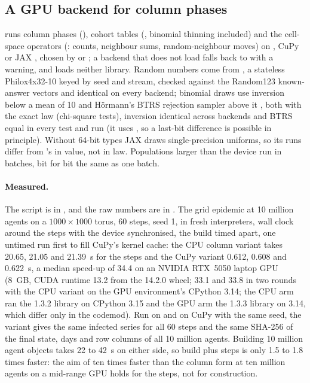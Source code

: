 \subsection{A GPU backend for column phases}
\label{app:gpu}

 runs column phases (), cohort tables
(, binomial thinning included) and the cell-space operators
(: counts, neighbour sums, random-neighbour moves) on ,
CuPy \citep{okuta2017cupy} or JAX \citep{bradbury2018jax}, chosen by  or
; a backend that does not load falls back to  with a
warning, and  loads neither library. Random numbers come from
, a stateless Philox4x32-10 \citep{salmon2011parallel} keyed by seed and
stream, checked against the Random123 known-answer vectors and identical on every backend;
binomial draws use inversion below a mean of 10 and Hörmann's BTRS rejection sampler above it
\citep{hormann1993generation}, both with the exact law (chi-square tests), inversion identical
across backends and BTRS equal in every test and run (it uses , so a last-bit
difference is possible in principle). Without 64-bit types JAX draws single-precision
uniforms, so its runs differ from 's in value, not in law. Populations larger
than the device run in batches, bit for bit the same as one batch.

\paragraph{Measured.} The script is  in ,
and the raw numbers are in . The grid epidemic at 10
million agents on a $1000 \times 1000$ torus, 60 steps, seed 1, in fresh interpreters, wall
clock around the steps with the device synchronised, the build timed apart, one untimed run
first to fill CuPy's kernel cache: the CPU column variant takes 20.65, 21.05 and 21.39~s for the steps and the CuPy variant 0.612,
0.608 and 0.622~s, a median speed-up of 34.4 on an NVIDIA RTX~5050 laptop GPU (8~GB, CUDA
runtime 13.2 from the  14.2.0 wheel; 33.1 and 33.8 in two rounds with the
CPU variant on the GPU environment's CPython 3.14; the CPU arm ran the 1.3.2 library on
CPython 3.15 and the GPU arm the 1.3.3 library on 3.14, which differ only in the codemod). Run on  and on CuPy with the
same seed, the variant gives the same infected series for all 60 steps and the same SHA-256 of
the final state, days and row columns of all 10 million agents. Building 10 million agent
objects takes 22 to 42~s on either side, so build plus steps is only 1.5 to 1.8 times
faster: the aim of ten times faster than the column form at ten million agents on a mid-range
GPU holds for the steps, not for construction.

